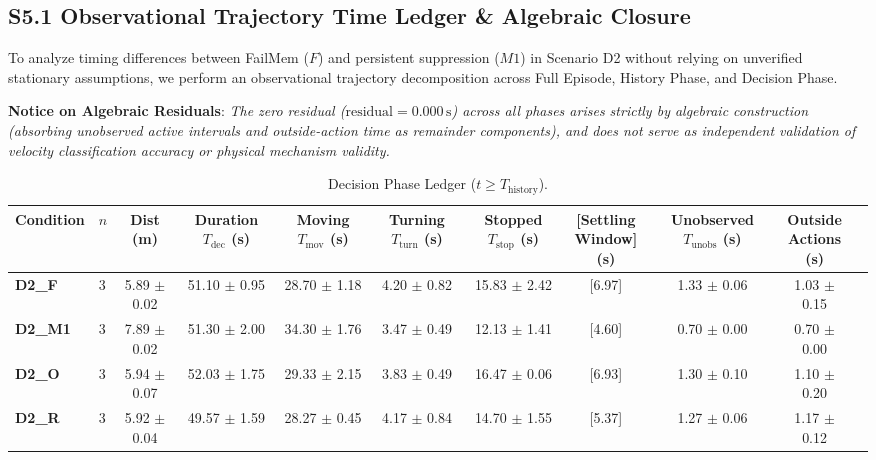 \documentclass[10pt]{article}
\begin{document}
\subsection{S5.1 Observational Trajectory Time Ledger \& Algebraic Closure}
To analyze timing differences between FailMem ($F$) and persistent suppression ($M1$) in Scenario D2 without relying on unverified stationary assumptions, we perform an observational trajectory decomposition across Full Episode, History Phase, and Decision Phase.

\noindent\textbf{Notice on Algebraic Residuals}: \emph{The zero residual ($\text{residual} = 0.000\,\text{s}$) across all phases arises strictly by algebraic construction (absorbing unobserved active intervals and outside-action time as remainder components), and does not serve as independent validation of velocity classification accuracy or physical mechanism validity.}

\begin{table}[t]
\centering
\footnotesize
\caption{Decision Phase Ledger ($t \ge T_{\text{history}}$).}
\label{tab:ledger_dec}
\setlength{\tabcolsep}{2.8pt}
\begin{tabular*}{\textwidth}{@{\extracolsep{\fill}}llccccccccc@{}}
\toprule
Condition & $n$ & \shortstack{Dist\\(m)} & \shortstack{Duration\\$T_{\text{dec}}$ (s)} & \shortstack{Moving\\$T_{\text{mov}}$ (s)} & \shortstack{Turning\\$T_{\text{turn}}$ (s)} & \shortstack{Stopped\\$T_{\text{stop}}$ (s)} & \shortstack{[Settling\\Window] (s)} & \shortstack{Unobserved\\$T_{\text{unobs}}$ (s)} & \shortstack{Outside\\Actions (s)} \\
\midrule
\textbf{D2\_F}  & 3 & 5.89 $\pm$ 0.02 & 51.10 $\pm$ 0.95 & 28.70 $\pm$ 1.18 & 4.20 $\pm$ 0.82 & 15.83 $\pm$ 2.42 & [6.97] & 1.33 $\pm$ 0.06 & 1.03 $\pm$ 0.15 \\
\textbf{D2\_M1} & 3 & 7.89 $\pm$ 0.02 & 51.30 $\pm$ 2.00 & 34.30 $\pm$ 1.76 & 3.47 $\pm$ 0.49 & 12.13 $\pm$ 1.41 & [4.60] & 0.70 $\pm$ 0.00 & 0.70 $\pm$ 0.00 \\
\textbf{D2\_O}  & 3 & 5.94 $\pm$ 0.07 & 52.03 $\pm$ 1.75 & 29.33 $\pm$ 2.15 & 3.83 $\pm$ 0.49 & 16.47 $\pm$ 0.06 & [6.93] & 1.30 $\pm$ 0.10 & 1.10 $\pm$ 0.20 \\
\textbf{D2\_R}  & 3 & 5.92 $\pm$ 0.04 & 49.57 $\pm$ 1.59 & 28.27 $\pm$ 0.45 & 4.17 $\pm$ 0.84 & 14.70 $\pm$ 1.55 & [5.37] & 1.27 $\pm$ 0.06 & 1.17 $\pm$ 0.12 \\
\bottomrule
\end{tabular*}
\end{table}
\end{document}

